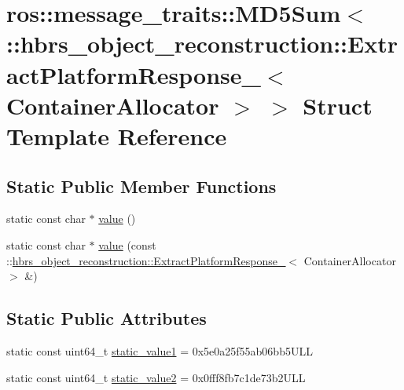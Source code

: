 \hypertarget{structros_1_1message__traits_1_1_m_d5_sum_3_01_1_1hbrs__object__reconstruction_1_1_extract_platfe02bd193932d0f6b32732e8a756f98f0}{\section{ros\-:\-:message\-\_\-traits\-:\-:\-M\-D5\-Sum$<$ \-:\-:hbrs\-\_\-object\-\_\-reconstruction\-:\-:\-Extract\-Platform\-Response\-\_\-$<$ \-Container\-Allocator $>$ $>$ \-Struct \-Template \-Reference}
\label{structros_1_1message__traits_1_1_m_d5_sum_3_01_1_1hbrs__object__reconstruction_1_1_extract_platfe02bd193932d0f6b32732e8a756f98f0}
}
\subsection*{\-Static \-Public \-Member \-Functions}
\begin{DoxyCompactItemize}
\item 
static const char $\ast$ \hyperlink{structros_1_1message__traits_1_1_m_d5_sum_3_01_1_1hbrs__object__reconstruction_1_1_extract_platfe02bd193932d0f6b32732e8a756f98f0_ac2d9543052aeb3af32d47c976ceb8f00}{value} ()
\item 
static const char $\ast$ \hyperlink{structros_1_1message__traits_1_1_m_d5_sum_3_01_1_1hbrs__object__reconstruction_1_1_extract_platfe02bd193932d0f6b32732e8a756f98f0_a6947083a42f018cef1d2ceea069b4b7f}{value} (const \-::\hyperlink{structhbrs__object__reconstruction_1_1_extract_platform_response__}{hbrs\-\_\-object\-\_\-reconstruction\-::\-Extract\-Platform\-Response\-\_\-}$<$ \-Container\-Allocator $>$ \&)
\end{DoxyCompactItemize}
\subsection*{\-Static \-Public \-Attributes}
\begin{DoxyCompactItemize}
\item 
static const uint64\-\_\-t \hyperlink{structros_1_1message__traits_1_1_m_d5_sum_3_01_1_1hbrs__object__reconstruction_1_1_extract_platfe02bd193932d0f6b32732e8a756f98f0_ad203f4c61fb9a341fede42f26c1fb147}{static\-\_\-value1} = 0x5e0a25f55ab06bb5\-U\-L\-L
\item 
static const uint64\-\_\-t \hyperlink{structros_1_1message__traits_1_1_m_d5_sum_3_01_1_1hbrs__object__reconstruction_1_1_extract_platfe02bd193932d0f6b32732e8a756f98f0_ade934384b47a5c8a4b99e780d22c311e}{static\-\_\-value2} = 0x0fff8fb7c1de73b2\-U\-L\-L
\end{DoxyCompactItemize}
